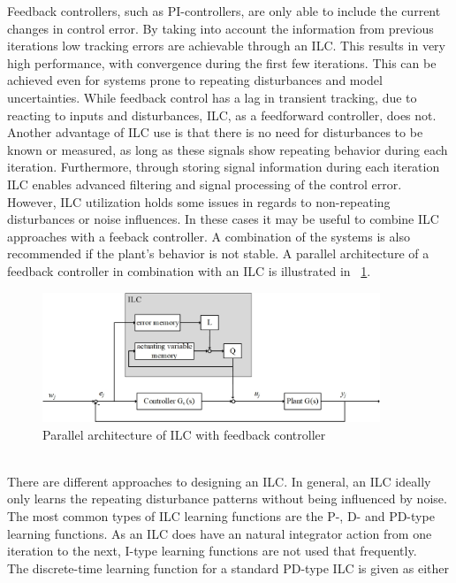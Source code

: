  Feedback controllers, such as PI-controllers, are only able to include the current changes in control error. By taking into account the information from previous iterations low tracking errors are achievable through an ILC. This results in very high performance, with convergence during the first few iterations. This can be achieved even for systems prone to repeating disturbances and model uncertainties. While feedback control has a lag in transient tracking, due to reacting to inputs and disturbances, ILC, as a feedforward controller, does not. Another advantage of ILC use is that there is no need for disturbances to be known or measured, as long as these signals show repeating behavior during each iteration. Furthermore, through storing signal information during each iteration ILC enables advanced filtering and signal processing of the control error. However, ILC utilization holds some issues in regards to non-repeating disturbances or noise influences. In these cases it may be useful to combine ILC approaches with a feeback controller. A combination of the systems is also recommended if the plant's behavior is not stable. \cite{ILC2} A parallel architecture of a feedback controller in combination with an ILC is illustrated in \figurename~\ref{fig:ILC_parallel}.
 \begin{figure}[h]
    \centering
    \includegraphics[width=0.9\textwidth]{images/ILC_parallel.jpg}
    \caption[Parallel architecture of ILC with feedback controller]{Parallel architecture of ILC with feedback controller}
    \label{fig:ILC_parallel}
  \end{figure}
\\There are different approaches to designing an ILC. In general, an ILC ideally only learns the repeating disturbance patterns without being influenced by noise. The most common types of ILC learning functions are the P-, D- and PD-type learning functions. As an ILC does have an natural integrator action from one iteration to the next, I-type learning functions are not used that frequently.
\\The discrete-time learning function for a standard PD-type ILC is given as either
